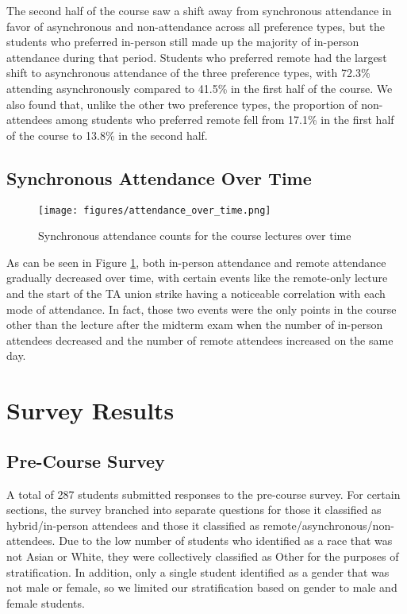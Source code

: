 The second half of the course saw a shift away from synchronous attendance in favor of asynchronous and non-attendance across all preference types, but the students who preferred in-person still made up the majority of in-person attendance during that period. Students who preferred remote had the largest shift to asynchronous attendance of the three preference types, with 72.3\% attending asynchronously compared to 41.5\% in the first half of the course. We also found that, unlike the other two preference types, the proportion of non-attendees among students who preferred remote fell from 17.1\% in the first half of the course to 13.8\% in the second half.

\subsection{Synchronous Attendance Over Time}

\begin{figure}[H]
    \vspace{5mm}
    \centering
    \texttt{[image: figures/attendance\_over\_time.png]}
    \caption{Synchronous attendance counts for the course lectures over time}
    \label{fig:attendance_over_time}
\end{figure}

As can be seen in Figure \ref{fig:attendance_over_time}, both in-person attendance and remote attendance gradually decreased over time, with certain events like the remote-only lecture and the start of the TA union strike having a noticeable correlation with each mode of attendance. In fact, those two events were the only points in the course other than the lecture after the midterm exam when the number of in-person attendees decreased and the number of remote attendees increased on the same day.

\section{Survey Results}

\subsection{Pre-Course Survey}

A total of 287 students submitted responses to the pre-course survey. For certain sections, the survey branched into separate questions for those it classified as hybrid/in-person attendees and those it classified as remote/asynchronous/non-attendees. Due to the low number of students who identified as a race that was not Asian or White, they were collectively classified as Other for the purposes of stratification. In addition, only a single student identified as a gender that was not male or female, so we limited our stratification based on gender to male and female students.

